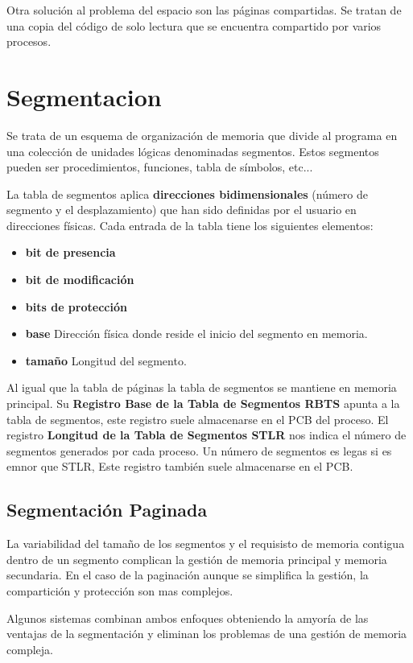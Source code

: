 Otra solución al problema del espacio son las páginas compartidas. Se tratan de una copia del código de solo lectura que se encuentra compartido por varios procesos.

\section*{Segmentacion}
Se trata de un esquema de organización de memoria que divide al programa en una colección de unidades lógicas denominadas segmentos. Estos segmentos pueden ser procedimientos, funciones, tabla de símbolos, etc...

La tabla de segmentos aplica \textbf{direcciones bidimensionales} (número de segmento y el desplazamiento) que han sido definidas por el usuario en direcciones físicas. Cada entrada de la tabla tiene los siguientes elementos:

 \begin{itemize}
 		\item\textbf{bit de presencia}
		\item\textbf{bit de modificación}
		\item\textbf{bits de protección}
		\item\textbf{base} Dirección física donde reside el inicio del segmento en memoria.
		\item\textbf{tamaño} Longitud del segmento.
 \end{itemize}

Al igual que la tabla de páginas la tabla de segmentos se mantiene en memoria principal. Su \textbf{Registro Base de la Tabla de Segmentos RBTS} apunta a la tabla de segmentos, este registro suele almacenarse en el PCB del proceso. El  registro \textbf{Longitud de la Tabla de Segmentos STLR} nos indica el número de segmentos generados por cada proceso. Un número de segmentos es legas si es emnor que STLR, Este registro también suele almacenarse en el PCB.

\subsection*{Segmentación Paginada}
La variabilidad del tamaño de los segmentos y el requisisto de memoria contigua dentro de un segmento complican la gestión de memoria principal y memoria secundaria. En el caso de la paginación aunque se simplifica la gestión, la compartición y protección son mas complejos.

Algunos sistemas combinan ambos enfoques obteniendo la amyoría de las ventajas de la segmentación y eliminan los problemas de una gestión de memoria compleja.

